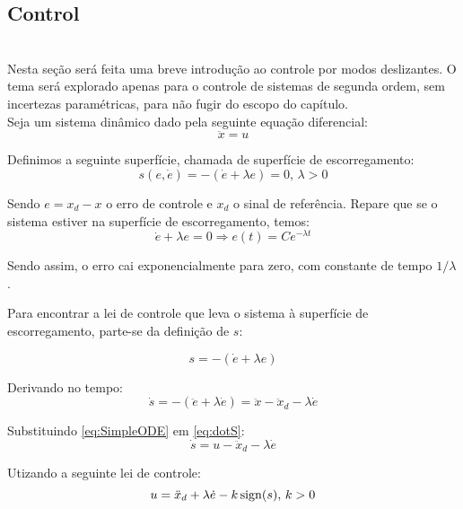 \subsection{Control}\label{S03-2}
 
\\

Nesta se\c{c}\~ao ser\'a feita uma breve introdu\c{c}\~ao ao controle por modos deslizantes. O tema ser\'a explorado apenas para o controle de sistemas de segunda ordem, sem incertezas param\'etricas, para n\~ao fugir do escopo do cap\'itulo. \\

Seja um sistema din\^amico dado pela seguinte equa\c{c}\~ao diferencial:
\begin{equation} \label{eq:SimpleODE}
\ddot{x} = u
\end{equation}

Definimos a seguinte superf\'icie, chamada de superf\'icie de escorregamento:
\begin{equation} \label{eq:SlidingSurface}
s(e, \dot{e}) = - (\dot{e} + \lambda e) = 0, \, \lambda > 0
\end{equation}

Sendo $e = x_d - x$ o erro de controle e $x_d$ o sinal de refer\^encia. Repare que se o sistema estiver na superf\'icie de escorregamento, temos:
\begin{equation} \label{eq:SlidingError}
\dot{e} + \lambda e = 0 \Rightarrow e(t) = C e^{- \lambda t}
\end{equation}

Sendo assim, o erro cai exponencialmente para zero, com constante de tempo $1/\lambda$.

Para encontrar a lei de controle que leva o sistema \`a superf\'icie de escorregamento, parte-se da defini\c{c}\~ao de $s$:

$$ s = -(\dot{e} + \lambda e) $$

Derivando no tempo:
\begin{equation} \label{eq:dotS}
\dot{s} =  -(\ddot{e} + \lambda \dot{e}) = \ddot{x} - \ddot{x}_d - \lambda \dot{e} 
\end{equation}

Substituindo \eqref{eq:SimpleODE} em \eqref{eq:dotS}:
\begin{equation} \label{dotS2}
\dot{s} = u - \ddot{x}_d - \lambda \dot{e}
\end{equation}

Utizando a seguinte lei de controle:
\begin{equation} \label{SMControlLaw1D}
u = \ddot{x}_d + \lambda \dot{e} - k \operatorname*{sign} (s), \, k>0
\end{equation}

